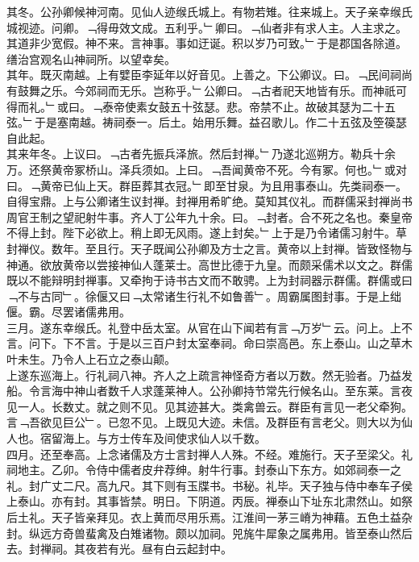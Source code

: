\documentclass{zhvt-classic}
\begin{document}
\hspace*{2em}其冬。公孙卿候神河南。见仙人迹缑氏城上。有物若雉。往来城上。天子亲幸缑氏城视迹。问卿。﹁得毋效文成。五利乎。﹂卿曰。﹁仙者非有求人主。人主求之。其道非少宽假。神不来。言神事。事如迂诞。积以岁乃可致。﹂于是郡国各除道。缮治宫观名山神祠所。以望幸矣。\\
\hspace*{2em}其年。既灭南越。上有嬖臣李延年以好音见。上善之。下公卿议。曰。﹁民间祠尚有鼓舞之乐。今郊祠而无乐。岂称乎。﹂公卿曰。﹁古者祀天地皆有乐。而神祇可得而礼。﹂或曰。﹁泰帝使素女鼓五十弦瑟。悲。帝禁不止。故破其瑟为二十五弦。﹂于是塞南越。祷祠泰一。后土。始用乐舞。益召歌儿。作二十五弦及箜篌瑟自此起。\\
\hspace*{2em}其来年冬。上议曰。﹁古者先振兵泽旅。然后封禅。﹂乃遂北巡朔方。勒兵十余万。还祭黄帝冢桥山。泽兵须如。上曰。﹁吾闻黄帝不死。今有冢。何也。﹂或对曰。﹁黄帝已仙上天。群臣葬其衣冠。﹂即至甘泉。为且用事泰山。先类祠泰一。\\
\hspace*{2em}自得宝鼎。上与公卿诸生议封禅。封禅用希旷绝。莫知其仪礼。而群儒采封禅尚书周官王制之望祀射牛事。齐人丁公年九十余。曰。﹁封者。合不死之名也。秦皇帝不得上封。陛下必欲上。稍上即无风雨。遂上封矣。﹂上于是乃令诸儒习射牛。草封禅仪。数年。至且行。天子既闻公孙卿及方士之言。黄帝以上封禅。皆致怪物与神通。欲放黄帝以尝接神仙人蓬莱士。高世比德于九皇。而颇采儒术以文之。群儒既以不能辩明封禅事。又牵拘于诗书古文而不敢骋。上为封祠器示群儒。群儒或曰﹁不与古同﹂。徐偃又曰﹁太常诸生行礼不如鲁善﹂。周霸属图封事。于是上绌偃。霸。尽罢诸儒弗用。\\
\hspace*{2em}三月。遂东幸缑氏。礼登中岳太室。从官在山下闻若有言﹁万岁﹂云。问上。上不言。问下。下不言。于是以三百户封太室奉祠。命曰崇高邑。东上泰山。山之草木叶未生。乃令人上石立之泰山颠。\\
\hspace*{2em}上遂东巡海上。行礼祠八神。齐人之上疏言神怪奇方者以万数。然无验者。乃益发船。令言海中神山者数千人求蓬莱神人。公孙卿持节常先行候名山。至东莱。言夜见一人。长数丈。就之则不见。见其迹甚大。类禽兽云。群臣有言见一老父牵狗。言﹁吾欲见巨公﹂。已忽不见。上既见大迹。未信。及群臣有言老父。则大以为仙人也。宿留海上。与方士传车及间使求仙人以千数。\\
\hspace*{2em}四月。还至奉高。上念诸儒及方士言封禅人人殊。不经。难施行。天子至梁父。礼祠地主。乙卯。令侍中儒者皮弁荐绅。射牛行事。封泰山下东方。如郊祠泰一之礼。封广丈二尺。高九尺。其下则有玉牒书。书秘。礼毕。天子独与侍中奉车子侯上泰山。亦有封。其事皆禁。明日。下阴道。丙辰。禅泰山下址东北肃然山。如祭后土礼。天子皆亲拜见。衣上黄而尽用乐焉。江淮间一茅三嵴为神藉。五色土益杂封。纵远方奇兽蜚禽及白雉诸物。颇以加祠。兕旄牛犀象之属弗用。皆至泰山然后去。封禅祠。其夜若有光。昼有白云起封中。\\
\end{document}
